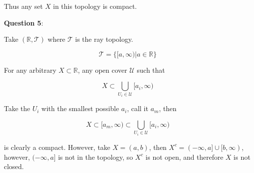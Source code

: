 \documentclass{article} %
\newcommand{\question}[2][]{
  \begin{flushleft}
    \textbf{Question #1}: \textit{#2}

\end{flushleft}}
\begin{document}
Thus any set $X$ in this topology is compact.

\question[5]{}

Take $(\mathbb{R}, \mathcal{T})$ where $\mathcal{T}$ is the ray topology.

\[
  \mathcal{T} = \{[a, \infty) \vert a \in \mathbb{R}\}
\]

For any arbitrary $X \subset \mathbb{R}$, any open cover $\mathcal{U}$ such that

\[
  X \subset \bigcup_{U_i \in \mathcal{U}} [a_i, \infty)
\]

Take the $U_i$ with the smallest possible $a_i$, call it $a_m$, then

\[
  X \subset [a_m, \infty) \subset \bigcup_{U_i \in \mathcal{U}} [a_i, \infty)
\]

is clearly a compact. However, take $X = (a,b)$, then $X^c =
(-\infty, a] \cup [b, \infty)$, however, $(-\infty, a]$ is not in the
topology, so $X^c$ is not open, and therefore $X$ is not closed.
\end{document}
